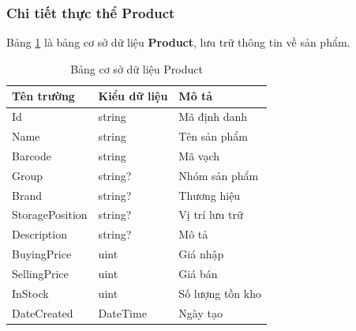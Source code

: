 \documentclass[../DoAn.tex]{subfiles}
\begin{document}
\subsubsection{Chi tiết thực thể Product}
\label{subsubsection:detaildesign-database-product}
Bảng \ref{table:database_product} là bảng cơ sở dữ liệu \textbf{Product}, lưu trữ thông tin về sản phẩm.
\begin{table}[H]
    \centering
    \begin{tabularx}{\textwidth}{|p{4cm}|p{3cm}|X|}
        \hline
        \textbf{Tên trường} & \textbf{Kiểu dữ liệu} & \textbf{Mô tả}   \\ \hline
        Id                  & string                & Mã định danh     \\ \hline
        Name                & string                & Tên sản phẩm     \\ \hline
        Barcode             & string                & Mã vạch          \\ \hline
        Group               & string?               & Nhóm sản phẩm    \\ \hline
        Brand               & string?               & Thương hiệu      \\ \hline
        StoragePosition     & string?               & Vị trí lưu trữ   \\ \hline
        Description         & string?               & Mô tả            \\ \hline
        BuyingPrice         & uint                  & Giá nhập         \\ \hline
        SellingPrice        & uint                  & Giá bán          \\ \hline
        InStock             & uint                  & Số lượng tồn kho \\ \hline
        DateCreated         & DateTime              & Ngày tạo         \\ \hline
    \end{tabularx}
    \caption{Bảng cơ sở dữ liệu Product}
    \label{table:database_product}
\end{table}
\end{document}
